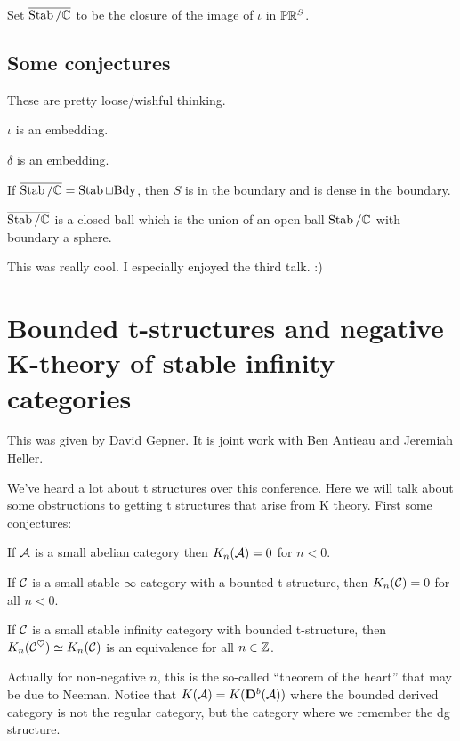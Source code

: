 \documentclass[12pt]{article}
\begin{document}
Set $\overline{\operatorname{Stab}/\mathbb{C}}$ to be the closure of the image of $\iota$ in $\mathbb{P}\mathbb{R}^S$.

\subsection{Some conjectures}
These are pretty loose/wishful thinking. 
\begin{conj}
	$\iota$ is an embedding.
\end{conj}
\begin{conj}
	$\delta$ is an embedding.
\end{conj}
\begin{conj}
	If $\overline{\operatorname{Stab}/\mathbb{C}}=\operatorname{Stab}\sqcup \text{Bdy}$, then $S$ is in the boundary and is dense in the boundary.
\end{conj}
\begin{conj}
	$\overline{\operatorname{Stab}/\mathbb{C}}$ is a closed ball which is the union of an open ball $\operatorname{Stab}/\mathbb{C}$ with boundary a sphere.
\end{conj}

This was really cool. I especially enjoyed the third talk. :)

\section{Bounded t-structures and negative K-theory of stable infinity categories}
This was given by David Gepner. It is joint work with Ben Antieau and Jeremiah Heller.

We've heard a lot about t structures over this conference. Here we will talk about some obstructions to getting t structures that arise from K theory.
First some conjectures:
\begin{conj}
	If $\mathcal{A}$ is a small abelian category then $K_n(\mathcal{A})=0$ for $n<0$.
\end{conj}
\begin{conj}[A-G-H]
	If $\mathcal{C}$ is a small stable $\infty$-category with a bounted t structure, then $K_n(\mathcal{C})=0$ for all $n<0$.
\end{conj}
\begin{conj}
	If $\mathcal{C}$ is a small stable infinity category with bounded t-structure, then $K_n(\mathcal{C}^\heartsuit)\simeq K_n(\mathcal{C})$ is an equivalence for all $n\in\mathbb{Z}$.
\end{conj}
\begin{rmk}
	Actually for non-negative $n$, this is the so-called ``theorem of the heart'' that may be due to Neeman. Notice that $K(\mathcal{A})=K(\mathbf{D}^b(\mathcal{A}))$ where the bounded 
	derived category is not the regular category, but the category where we remember the dg structure.
\end{rmk}
\end{document}
